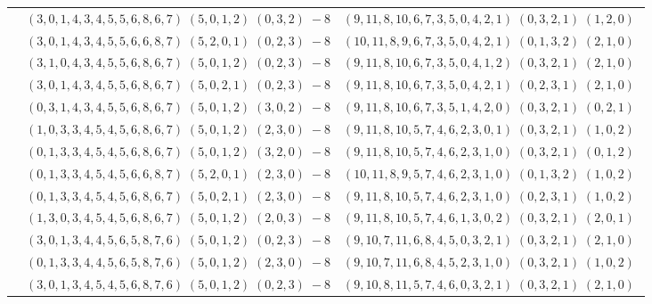 \documentclass[11pt]{article}
\begin{document}
\begin{longtable}[l]{|c|c|c|}
 \cline{2-3} 
 & $(3 ,0 ,1 ,4 ,3 ,4 ,5 ,5 ,6 ,8 ,6 ,7) \;(5 ,0 ,1 ,2) \;(0 ,3 ,2) \;-8$ & $(9 ,11 ,8 ,10 ,6 ,7 ,3 ,5 ,0 ,4 ,2 ,1) \;(0 ,3 ,2 ,1) \;(1 ,2 ,0) \;$\\ 
 \cline{2-3} 
 & $(3 ,0 ,1 ,4 ,3 ,4 ,5 ,5 ,6 ,6 ,8 ,7) \;(5 ,2 ,0 ,1) \;(0 ,2 ,3) \;-8$ & $(10 ,11 ,8 ,9 ,6 ,7 ,3 ,5 ,0 ,4 ,2 ,1) \;(0 ,1 ,3 ,2) \;(2 ,1 ,0) \;$\\ 
 \cline{2-3} 
 & $(3 ,1 ,0 ,4 ,3 ,4 ,5 ,5 ,6 ,8 ,6 ,7) \;(5 ,0 ,1 ,2) \;(0 ,2 ,3) \;-8$ & $(9 ,11 ,8 ,10 ,6 ,7 ,3 ,5 ,0 ,4 ,1 ,2) \;(0 ,3 ,2 ,1) \;(2 ,1 ,0) \;$\\ 
 \cline{2-3} 
 & $(3 ,0 ,1 ,4 ,3 ,4 ,5 ,5 ,6 ,8 ,6 ,7) \;(5 ,0 ,2 ,1) \;(0 ,2 ,3) \;-8$ & $(9 ,11 ,8 ,10 ,6 ,7 ,3 ,5 ,0 ,4 ,2 ,1) \;(0 ,2 ,3 ,1) \;(2 ,1 ,0) \;$\\ 
 \cline{2-3} 
 & $(0 ,3 ,1 ,4 ,3 ,4 ,5 ,5 ,6 ,8 ,6 ,7) \;(5 ,0 ,1 ,2) \;(3 ,0 ,2) \;-8$ & $(9 ,11 ,8 ,10 ,6 ,7 ,3 ,5 ,1 ,4 ,2 ,0) \;(0 ,3 ,2 ,1) \;(0 ,2 ,1) \;$\\ 
 \cline{2-3} 
 & $(1 ,0 ,3 ,3 ,4 ,5 ,4 ,5 ,6 ,8 ,6 ,7) \;(5 ,0 ,1 ,2) \;(2 ,3 ,0) \;-8$ & $(9 ,11 ,8 ,10 ,5 ,7 ,4 ,6 ,2 ,3 ,0 ,1) \;(0 ,3 ,2 ,1) \;(1 ,0 ,2) \;$\\ 
 \cline{2-3} 
 & $(0 ,1 ,3 ,3 ,4 ,5 ,4 ,5 ,6 ,8 ,6 ,7) \;(5 ,0 ,1 ,2) \;(3 ,2 ,0) \;-8$ & $(9 ,11 ,8 ,10 ,5 ,7 ,4 ,6 ,2 ,3 ,1 ,0) \;(0 ,3 ,2 ,1) \;(0 ,1 ,2) \;$\\ 
 \cline{2-3} 
 & $(0 ,1 ,3 ,3 ,4 ,5 ,4 ,5 ,6 ,6 ,8 ,7) \;(5 ,2 ,0 ,1) \;(2 ,3 ,0) \;-8$ & $(10 ,11 ,8 ,9 ,5 ,7 ,4 ,6 ,2 ,3 ,1 ,0) \;(0 ,1 ,3 ,2) \;(1 ,0 ,2) \;$\\ 
 \cline{2-3} 
 & $(0 ,1 ,3 ,3 ,4 ,5 ,4 ,5 ,6 ,8 ,6 ,7) \;(5 ,0 ,2 ,1) \;(2 ,3 ,0) \;-8$ & $(9 ,11 ,8 ,10 ,5 ,7 ,4 ,6 ,2 ,3 ,1 ,0) \;(0 ,2 ,3 ,1) \;(1 ,0 ,2) \;$\\ 
 \cline{2-3} 
 & $(1 ,3 ,0 ,3 ,4 ,5 ,4 ,5 ,6 ,8 ,6 ,7) \;(5 ,0 ,1 ,2) \;(2 ,0 ,3) \;-8$ & $(9 ,11 ,8 ,10 ,5 ,7 ,4 ,6 ,1 ,3 ,0 ,2) \;(0 ,3 ,2 ,1) \;(2 ,0 ,1) \;$\\ 
 \cline{2-3} 
 & $(3 ,0 ,1 ,3 ,4 ,4 ,5 ,6 ,5 ,8 ,7 ,6) \;(5 ,0 ,1 ,2) \;(0 ,2 ,3) \;-8$ & $(9 ,10 ,7 ,11 ,6 ,8 ,4 ,5 ,0 ,3 ,2 ,1) \;(0 ,3 ,2 ,1) \;(2 ,1 ,0) \;$\\ 
 \cline{2-3} 
 & $(0 ,1 ,3 ,3 ,4 ,4 ,5 ,6 ,5 ,8 ,7 ,6) \;(5 ,0 ,1 ,2) \;(2 ,3 ,0) \;-8$ & $(9 ,10 ,7 ,11 ,6 ,8 ,4 ,5 ,2 ,3 ,1 ,0) \;(0 ,3 ,2 ,1) \;(1 ,0 ,2) \;$\\ 
 \cline{2-3} 
 & $(3 ,0 ,1 ,3 ,4 ,5 ,4 ,5 ,6 ,8 ,7 ,6) \;(5 ,0 ,1 ,2) \;(0 ,2 ,3) \;-8$ & $(9 ,10 ,8 ,11 ,5 ,7 ,4 ,6 ,0 ,3 ,2 ,1) \;(0 ,3 ,2 ,1) \;(2 ,1 ,0) \;$\\ 

\end{longtable}
\end{document}
